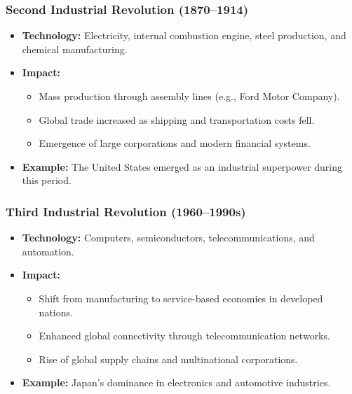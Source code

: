 \documentclass{article}
\begin{document}
\subsubsection*{Second Industrial Revolution (1870–1914)}
\begin{itemize}
    \item \textbf{Technology:} Electricity, internal combustion engine, steel production, and chemical manufacturing.
    \item \textbf{Impact:}
    \begin{itemize}
        \item Mass production through assembly lines (e.g., Ford Motor Company).
        \item Global trade increased as shipping and transportation costs fell.
        \item Emergence of large corporations and modern financial systems.
    \end{itemize}
    \item \textbf{Example:} The United States emerged as an industrial superpower during this period.
\end{itemize}

\subsubsection*{Third Industrial Revolution (1960–1990s)}
\begin{itemize}
    \item \textbf{Technology:} Computers, semiconductors, telecommunications, and automation.
    \item \textbf{Impact:}
    \begin{itemize}
        \item Shift from manufacturing to service-based economies in developed nations.
        \item Enhanced global connectivity through telecommunication networks.
        \item Rise of global supply chains and multinational corporations.
    \end{itemize}
    \item \textbf{Example:} Japan's dominance in electronics and automotive industries.
\end{itemize}
\end{document}
